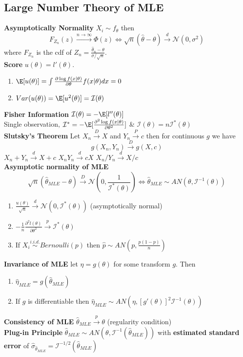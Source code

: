 \documentclass[8pt]{article}
\begin{document}
\begin{multicols}{3}
{   \subsection*{Large Number Theory of MLE}
   \textbf{Asymptotically Normality} $X_i\sim f_{\theta}$ then
   \[
    F_{Z_n}(z) \stackrel{n\to \infty}{\to} \Phi(z) \iff \sqrt{n}(\hat{\theta} - \theta) \stackrel{d}{\to} \mathcal{N}(0,\sigma^2)
   \]
   where $F_{Z_n}$ is the cdf of $Z_n = \frac{\hat{\theta}_n - \theta}{\sigma / \sqrt{n}}$.\\
   \textbf{Score} $u(\theta) = l'(\theta)$. \\
   \begin{enumerate}
     \item $\E[u(\theta)]= \int \frac{\partial \log f(x|\theta)}{\partial \theta} f(x|\theta) dx =0$
     \item $Var(u(\theta)) = \E [u^2(\theta)] = \mathcal{I}(\theta)$
   \end{enumerate}
   \textbf{Fisher Information} $\mathcal{I}(\theta) = - \E[l''(\theta)]$ \\
   Single observation, $\mathcal{I}^* = - \E [\frac{\partial^2 \log f(x|\theta)}{\partial \theta^2} ]$ & $\mathcal{I}(\theta) = n \mathcal{I}^* (\theta)$\\
   \textbf{Slutsky's Theorem} Let $X_n \stackrel{D}{\to} X$ and $Y_n \stackrel{P}{\to} c$ then for continuous $g$ we have
   \[
     g(X_n, Y_n) \stackrel{D}{\to} g(X, c)
   \]
   $X_n + Y_n \stackrel{d}{\to} X + c$ \quad $X_n Y_n \stackrel{d}{\to} cX$ \quad $X_n / Y_n \stackrel{d}{\to} X / c$\\
   \textbf{Asymptotic normality of MLE}
   \[
    \sqrt{n}(\hat{\theta}_{MLE} - \theta) \stackrel{D}{\to}\mathcal{N}(0, \frac{1}{\mathcal{I}^{*}(\theta)}) \iff \hat{\theta}_{MLE} \sim AN(\theta, \mathcal{I}^{-1}(\theta))
   \]
   \begin{enumerate}
     \item $\frac{u(\theta)}{\sqrt{n}} \stackrel{d}{\to} \mathcal{N}(0, \mathcal{I}^*(\theta))$ (asymptotically normal)
     \item $-\frac{1}{n} \frac{\partial^2 l(\theta)}{\partial \theta^2} \stackrel{p}{\to} \mathcal{I}^* (\theta)$
     \item If $X_i \stackrel{i.i.d.}{\sim} Bernoulli(p)$ then $\hat{p} \sim AN(p, \frac{p(1-p)}{n})$
   \end{enumerate}
   \textbf{Invariance of MLE} let $\eta = g(\theta)$ for some transform $g$. Then
   \begin{enumerate}
     \item $\hat{\eta}_{MLE} = g(\hat{\theta}_{MLE})$
     \item If $g$ is differentiable then $\hat{\eta}_{MLE} \sim AN(\eta, [g'(\theta)]^2 \mathcal{I}^{-1}(\theta))$
   \end{enumerate}
   \textbf{Consistency of MLE} $\hat{\theta}_{MLE}\stackrel{p}{\to} \theta$  (regularity condition) \\
   \textbf{Plug-in Principle} $\hat{\theta}_{MLE} \sim AN(\theta, \mathcal{I}^{-1}(\hat{\theta}_{MLE}))$ with \textbf{estimated standard error} of $\hat{\sigma}_{\hat{\theta}_{MLE}} = \mathcal{I}^{-1/2}(\hat{\theta}_{MLE})$\\

}
\end{multicols}
\end{document}
